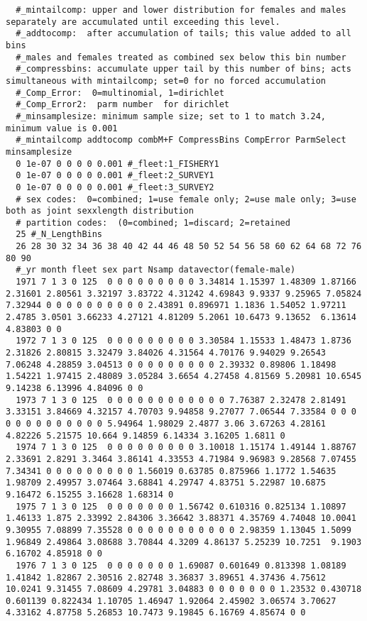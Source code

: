 \begin{landscape}
{\begin{verbatim}
  #_mintailcomp: upper and lower distribution for females and males separately are accumulated until exceeding this level.
  #_addtocomp:  after accumulation of tails; this value added to all bins
  #_males and females treated as combined sex below this bin number 
  #_compressbins: accumulate upper tail by this number of bins; acts simultaneous with mintailcomp; set=0 for no forced accumulation
  #_Comp_Error:  0=multinomial, 1=dirichlet
  #_Comp_Error2:  parm number  for dirichlet
  #_minsamplesize: minimum sample size; set to 1 to match 3.24, minimum value is 0.001
  #_mintailcomp addtocomp combM+F CompressBins CompError ParmSelect minsamplesize
  0 1e-07 0 0 0 0 0.001 #_fleet:1_FISHERY1
  0 1e-07 0 0 0 0 0.001 #_fleet:2_SURVEY1
  0 1e-07 0 0 0 0 0.001 #_fleet:3_SURVEY2
  # sex codes:  0=combined; 1=use female only; 2=use male only; 3=use both as joint sexxlength distribution
  # partition codes:  (0=combined; 1=discard; 2=retained
  25 #_N_LengthBins
  26 28 30 32 34 36 38 40 42 44 46 48 50 52 54 56 58 60 62 64 68 72 76 80 90
  #_yr month fleet sex part Nsamp datavector(female-male)
  1971 7 1 3 0 125  0 0 0 0 0 0 0 0 0 3.34814 1.15397 1.48309 1.87166 2.31601 2.80561 3.32197 3.83722 4.31242 4.69843 9.9337 9.25965 7.05824 7.32944 0 0 0 0 0 0 0 0 0 0 2.43891 0.896971 1.1836 1.54052 1.97211 2.4785 3.0501 3.66233 4.27121 4.81209 5.2061 10.6473 9.13652  6.13614 4.83803 0 0
  1972 7 1 3 0 125  0 0 0 0 0 0 0 0 0 3.30584 1.15533 1.48473 1.8736 2.31826 2.80815 3.32479 3.84026 4.31564 4.70176 9.94029 9.26543 7.06248 4.28859 3.04513 0 0 0 0 0 0 0 0 0 2.39332 0.89806 1.18498 1.54221 1.97415 2.48089 3.05284 3.6654 4.27458 4.81569 5.20981 10.6545  9.14238 6.13996 4.84096 0 0
  1973 7 1 3 0 125  0 0 0 0 0 0 0 0 0 0 0 0 7.76387 2.32478 2.81491 3.33151 3.84669 4.32157 4.70703 9.94858 9.27077 7.06544 7.33584 0 0 0 0 0 0 0 0 0 0 0 0 0 5.94964 1.98029 2.4877 3.06 3.67263 4.28161 4.82226 5.21575 10.664 9.14859 6.14334 3.16205 1.6811 0
  1974 7 1 3 0 125  0 0 0 0 0 0 0 0 0 3.10018 1.15174 1.49144 1.88767 2.33691 2.8291 3.3464 3.86141 4.33553 4.71984 9.96983 9.28568 7.07455 7.34341 0 0 0 0 0 0 0 0 0 1.56019 0.63785 0.875966 1.1772 1.54635 1.98709 2.49957 3.07464 3.68841 4.29747 4.83751 5.22987 10.6875  9.16472 6.15255 3.16628 1.68314 0
  1975 7 1 3 0 125  0 0 0 0 0 0 0 1.56742 0.610316 0.825134 1.10897 1.46133 1.875 2.33992 2.84306 3.36642 3.88371 4.35769 4.74048 10.0041 9.30955 7.08899 7.35528 0 0 0 0 0 0 0 0 0 0 0 2.98359 1.13045 1.5099 1.96849 2.49864 3.08688 3.70844 4.3209 4.86137 5.25239 10.7251  9.1903 6.16702 4.85918 0 0
  1976 7 1 3 0 125  0 0 0 0 0 0 0 1.69087 0.601649 0.813398 1.08189 1.41842 1.82867 2.30516 2.82748 3.36837 3.89651 4.37436 4.75612 10.0241 9.31455 7.08609 4.29781 3.04883 0 0 0 0 0 0 0 1.23532 0.430718 0.601139 0.822434 1.10705 1.46947 1.92064 2.45902 3.06574 3.70627   4.33162 4.87758 5.26853 10.7473 9.19845 6.16769 4.85674 0 0

\end{verbatim}}
\end{landscape}
